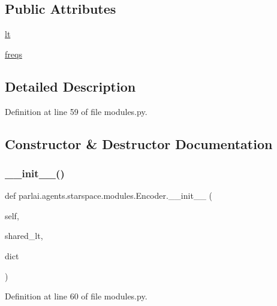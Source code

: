\subsection*{Public Attributes}
\begin{DoxyCompactItemize}
\item 
\hyperlink{classparlai_1_1agents_1_1starspace_1_1modules_1_1Encoder_a86957630e34a988b80074fbaeae14d7a}{lt}
\item 
\hyperlink{classparlai_1_1agents_1_1starspace_1_1modules_1_1Encoder_aaf45c31c5a3014cef4892cf836ebedb0}{freqs}
\end{DoxyCompactItemize}


\subsection{Detailed Description}


Definition at line 59 of file modules.\+py.



\subsection{Constructor \& Destructor Documentation}
\mbox{\label{classparlai_1_1agents_1_1starspace_1_1modules_1_1Encoder_a79b219a2d25de040514ebd76c15053a3}} 
\subsubsection{\texorpdfstring{\+\_\+\+\_\+init\+\_\+\+\_\+()}{\_\_init\_\_()}}
{\footnotesize\ttfamily def parlai.\+agents.\+starspace.\+modules.\+Encoder.\+\_\+\+\_\+init\+\_\+\+\_\+ (\begin{DoxyParamCaption}\item[{}]{self,  }\item[{}]{shared\+\_\+lt,  }\item[{}]{dict }\end{DoxyParamCaption})}



Definition at line 60 of file modules.\+py.



